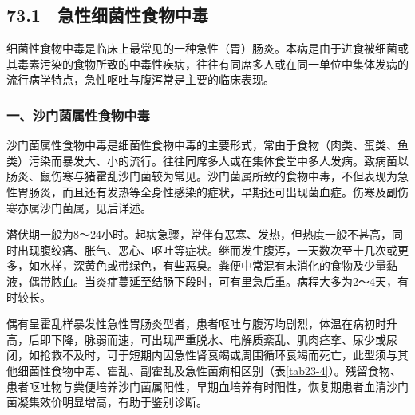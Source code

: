 \subsection{73.1　急性细菌性食物中毒}

细菌性食物中毒是临床上最常见的一种急性（胃）肠炎。本病是由于进食被细菌或其毒素污染的食物所致的中毒性疾病，往往有同席多人或在同一单位中集体发病的流行病学特点，急性呕吐与腹泻常是主要的临床表现。

\subsubsection{一、沙门菌属性食物中毒}

沙门菌属性食物中毒是细菌性食物中毒的主要形式，常由于食物（肉类、蛋类、鱼类）污染而暴发大、小的流行。往往同席多人或在集体食堂中多人发病。致病菌以肠炎、鼠伤寒与猪霍乱沙门菌较为常见。沙门菌属所致的食物中毒，不但表现为急性胃肠炎，而且还有发热等全身性感染的症状，早期还可出现菌血症。伤寒及副伤寒亦属沙门菌属，见后详述。

潜伏期一般为8～24小时。起病急骤，常伴有恶寒、发热，但热度一般不甚高，同时出现腹绞痛、胀气、恶心、呕吐等症状。继而发生腹泻，一天数次至十几次或更多，如水样，深黄色或带绿色，有些恶臭。粪便中常混有未消化的食物及少量黏液，偶带脓血。当炎症蔓延至结肠下段时，可有里急后重。病程大多为2～4天，有时较长。

偶有呈霍乱样暴发性急性胃肠炎型者，患者呕吐与腹泻均剧烈，体温在病初时升高，后即下降，脉弱而速，可出现严重脱水、电解质紊乱、肌肉痉挛、尿少或尿闭，如抢救不及时，可于短期内因急性肾衰竭或周围循环衰竭而死亡，此型须与其他细菌性食物中毒、霍乱、副霍乱及急性菌痢相区别（表\ref{tab23-4}）。残留食物、患者呕吐物与粪便培养沙门菌属阳性，早期血培养有时阳性，恢复期患者血清沙门菌凝集效价明显增高，有助于鉴别诊断。

